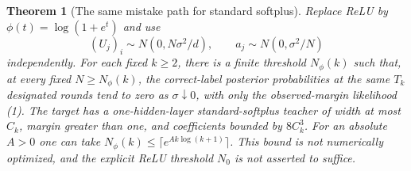 \documentclass[11pt]{article}
\newtheorem{theorem}{Theorem}\newtheorem{lemma}[theorem]{Lemma}
\begin{document}
\begin{theorem}[The same mistake path for standard softplus]
Replace ReLU by $\phi(t)=\log(1+e^t)$ and use
\[
 (U_j)_i\sim N(0,N\sigma^2/d),\qquad
 a_j\sim N(0,\sigma^2/N)
\]
independently. For each fixed $k\ge2$, there is a finite threshold
$N_\phi(k)$ such that, at every fixed $N\ge N_\phi(k)$, the correct-label
posterior probabilities at the same $T_k$ designated rounds tend to
zero as $\sigma\downarrow0$, with only the observed-margin likelihood (1).
The target has a one-hidden-layer standard-softplus teacher of width
at most $C_k$, margin greater than one, and coefficients bounded by
$8C_k^3$. For an absolute $A>0$ one can take
$N_\phi(k)\le\lceil e^{A k\log(k+1)}\rceil$.
This bound is not numerically optimized, and the explicit ReLU threshold
$N_0$ is not asserted to suffice.
\end{theorem}
\end{document}
